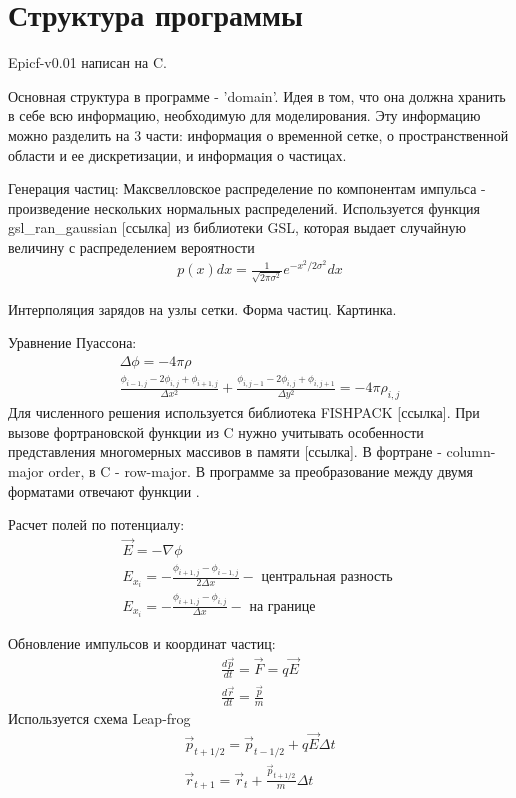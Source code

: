 \section{Структура программы}

Epicf-v0.01 написан на C. 

Основная структура в программе - 'domain'.
Идея в том, что она должна хранить в себе всю информацию, необходимую для 
моделирования. Эту информацию можно разделить на 3 части: информация о 
временной сетке, о пространственной области и ее дискретизации, и информация о частицах.

Генерация частиц:
Максвелловское распределение по компонентам импульса - произведение
нескольких нормальных распределений. Используется функция gsl\_ran\_gaussian [ссылка]
из библиотеки GSL, которая выдает случайную величину с распределением вероятности
\begin{gather}
  p(x) dx = \frac{1}{\sqrt{2 \pi \sigma^2}} e^{-x^2 / 2\sigma^2} dx
\end{gather}


Интерполяция зарядов на узлы сетки. Форма частиц. Картинка. 

Уравнение Пуассона:
\begin{gather}
  \Delta \phi = - 4 \pi \rho  
  \\
  \frac{ \phi_{i-1,j} - 2 \phi_{i,j} + \phi_{i+1,j} }{ \Delta x^2 }
  + 
  \frac{ \phi_{i,j-1} - 2 \phi_{i,j} + \phi_{i,j+1} }{ \Delta y^2 }
  =
  -4 \pi \rho_{i,j}
\end{gather}
Для численного решения используется библиотека FISHPACK [ссылка]. 
При вызове фортрановской функции из C нужно учитывать особенности 
представления многомерных массивов в памяти [ссылка].
В фортране - column-major order, в C - row-major. 
В программе за преобразование между двумя форматами отвечают функции .

Расчет полей по потенциалу:
\begin{gather}
  \vec{ E } = - \nabla \phi
  \\
  E_{x_i} =  - \frac{ \phi_{i+1,j} - \phi_{i-1,j} }{ 2 \Delta x }  - \mbox{ центральная разность }
  \\
  E_{x_i} =  - \frac{ \phi_{i+1,j} - \phi_{i,j} }{ \Delta x } - \mbox{ на границе }
\end{gather}

Обновление импульсов и координат частиц:
\begin{gather}
  \frac{ d \vec{p} }{ d t } = \vec{ F } = q \vec{ E }
  \\
  \frac{ d \vec{r} }{ d t } = \frac{ \vec{p} }{ m }
\end{gather}
Используется схема Leap-frog
\begin{gather}
  \vec{p}_{t+1/2} = \vec{p}_{t-1/2} + q \vec{E} \Delta t  
  \\
  \vec{r}_{t+1} = \vec{r}_{t} + \frac{ \vec{p}_{t+1/2} }{ m } \Delta t
\end{gather}


